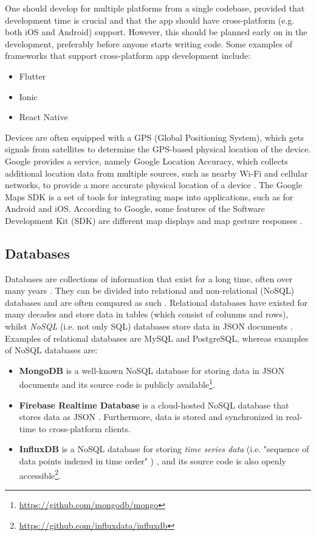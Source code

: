 \documentclass{article}
\begin{document}
One should develop for multiple platforms from a single codebase, provided that development time is crucial and that the app should have cross-platform (e.g. both iOS and Android) support. However, this should be planned early on in the development, preferably before anyone starts writing code. Some examples of frameworks that support cross-platform app development include:

\begin{itemize}
    \item Flutter
    \item Ionic
    \item React Native
\end{itemize}

Devices are often equipped with a GPS (Global Positioning System), which gets signals from satellites to determine the GPS-based physical location of the device. Google provides a service, namely Google Location Accuracy, which collects additional location data from multiple sources, such as nearby Wi-Fi and cellular networks, to provide a more accurate physical location of a device \cite{noauthor_how_nodate}. The Google Maps SDK is a set of tools for integrating maps into applications, such as for Android and iOS. According to Google, some features of the Software Development Kit (SDK) are different map displays and map gesture responses \cite{noauthor_maps_nodate}.

\subsection{Databases}
Databases are collections of information that exist for a long time, often over many years \cite{garcia-molina_database_2002}. They can be divided into relational and non-relational (NoSQL) databases and are often compared as such \cite{mohamed_relational_2014}. Relational databases have existed for many decades and store data in tables (which consist of columns and rows), whilst \emph{NoSQL} (i.e. not only SQL) databases store data in JSON documents \cite{garcia-molina_database_2002, sudiartha_data_2020}. Examples of relational databases are MySQL and PostgreSQL, whereas examples of NoSQL databases are: 
\begin{itemize}
    \item \textbf{MongoDB} is a well-known NoSQL database for storing data in JSON documents and its source code is publicly available\footnote{\url{https://github.com/mongodb/mongo}}.
    \item \textbf{Firebase Realtime Database} is a cloud-hosted NoSQL database that stores data as JSON  \cite{noauthor_firebase_nodate}. Furthermore, data is stored and synchronized in real-time to cross-platform clients.
    \item \textbf{InfluxDB} is a NoSQL database for storing \emph{time series data} (i.e. "sequence of data points indexed in time order" \cite{noauthor_what_nodate})  \cite{noauthor_influxdb_nodate}, and its source code is also openly accessible\footnote{\url{https://github.com/influxdata/influxdb}}.
\end{itemize}
\end{document}
